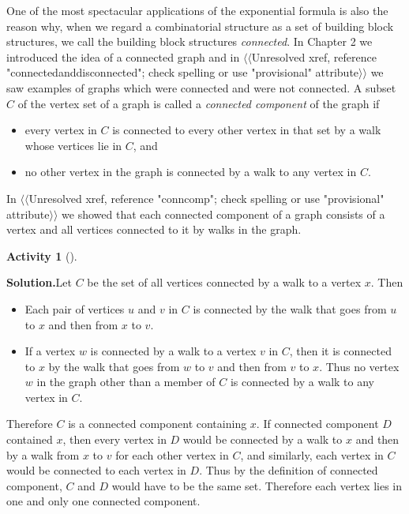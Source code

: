 \documentclass[10pt,]{book}
\theoremstyle{plain}
\theoremstyle{definition}
\newtheorem{activity}[project]{Activity}
\numberwithin{equation}{chapter}
\begin{document}
One of the most spectacular applications of the exponential formula is also the reason why, when we regard a combinatorial structure as a set of building block structures, we call the building block structures \emph{connected}. In Chapter 2 we introduced the idea of a connected graph and in {$\langle\langle$Unresolved xref, reference "connectedanddisconnected"; check spelling or use "provisional" attribute$\rangle\rangle$} we saw examples of graphs which were connected and were not connected. A subset \(C\) of the vertex set of a graph is called a \emph{connected component} of the graph if \leavevmode%
\begin{itemize}[label=\textbullet]
\item{}every vertex in \(C\) is connected to every other vertex in that set by a walk whose vertices lie in \(C\), and%
\item{}no other vertex in the graph is connected by a walk to any vertex in \(C\).%
\end{itemize}
%
\par
In {$\langle\langle$Unresolved xref, reference "conncomp"; check spelling or use "provisional" attribute$\rangle\rangle$} we showed that each connected component of a graph consists of a vertex and all vertices connected to it by walks in the graph.%
\begin{activity}[]\label{activity-118}
\par\medskip\noindent%
\textbf{Solution.}\quad Let \(C\) be the set of all vertices connected by a walk to a vertex \(x\). Then \leavevmode%
\begin{itemize}[label=\textbullet]
\item{}Each pair of vertices \(u\) and \(v\) in \(C\) is connected by the walk that goes from \(u\) to \(x\) and then from \(x\) to \(v\).%
\item{}If a vertex \(w\) is connected by a walk to a vertex \(v\) in \(C\), then it is connected to \(x\) by the walk that goes from \(w\) to \(v\) and then from \(v\) to \(x\).  Thus no  vertex \(w\) in the graph other than a member of \(C\) is connected by a walk to any vertex in \(C\).%
\end{itemize}
%
\par
Therefore \(C\) is a connected component containing \(x\). If connected component \(D\) contained \(x\), then every vertex in \(D\) would be connected by a walk to \(x\) and then by a walk from \(x\) to \(v\) for each other vertex in \(C\), and similarly, each vertex in \(C\) would be connected to each vertex in \(D\). Thus by the definition of connected component, \(C\) and \(D\) would have to be the same set. Therefore each vertex lies in one and only one connected component.%
\end{activity}
\end{document}
